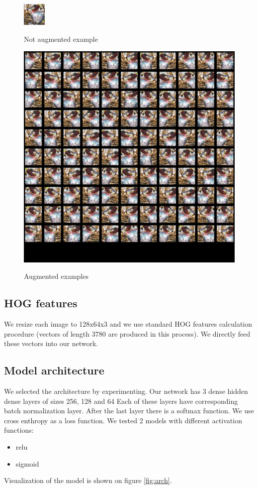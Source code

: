 \documentclass[a4paper]{article}
\begin{document}
\begin{figure}[h]
    \caption[]{Not augmented example}
    \centering
    \includegraphics[page=2,width=0.1\textwidth]{aug1.png}
    \label{fig:aug1}
\end{figure}

\begin{figure}[h]
    \caption[]{Augmented examples}
    \centering
    \includegraphics[page=2,width=1.0\textwidth]{aug2.png}
    \label{fig:aug2}
\end{figure}


\subsection{HOG features}
We resize each image to 128x64x3 and we use
standard HOG features calculation procedure
(vectors of length 3780 are produced in this process).
We directly feed these vectors into our network.

\subsection{Model architecture}
We selected the architecture by experimenting.
Our network has 3 dense hidden dense layers of sizes 256, 128 and 64
Each of these layers have corresponding batch normalization layer.
After the last layer there is a softmax function.
We use cross enthropy as a loss function.
We tested 2 models with different activation functions:
\begin{itemize}
    \item relu
    \item sigmoid
\end{itemize}
Visualization of the model is shown on figure \ref{fig:arch}.
\end{document}
